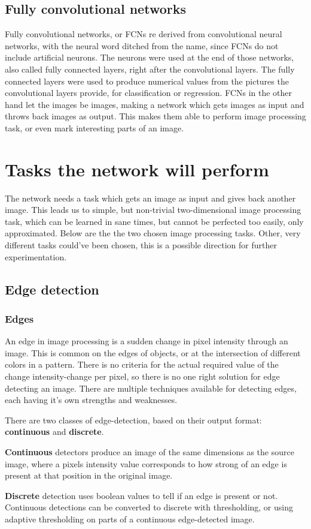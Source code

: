 \documentclass[12pt]{report}
\begin{document}
\section{Fully convolutional networks}
Fully convolutional networks, or FCNs re derived from convolutional neural networks, with the neural word ditched from the name, since FCNs do not include artificial neurons. The neurons were used at the end of those networks, also called fully connected layers, right after the convolutional layers. The fully connected layers were used to produce numerical values from the pictures the convolutional layers provide, for classification or regression. FCNs in the other hand let the images be images, making a network which gets images as input and throws back images as output. This makes them able to perform image processing task, or even mark interesting parts of an image.
\chapter{Tasks the network will perform}
The network needs a task which gets an image as input and gives back another image. This leads us to simple, but non-trivial two-dimensional image processing task, which can be learned in sane times, but cannot be perfected too easily, only approximated. Below are the the two chosen image processing tasks. Other, very different tasks could've been chosen, this is a possible direction for further experimentation.
\section{Edge detection}
\subsection{Edges}
An edge in image processing is a sudden change in pixel intensity through an image. This is common on the edges of objects, or at the intersection of different colors in a pattern. There is no criteria for the actual required value of the change intensity-change per pixel, so there is no one right solution for edge detecting an image. There are multiple techniques available for detecting edges, each having it's own strengths and weaknesses.\par
There are two classes of edge-detection, based on their output format: \textbf{continuous} and \textbf{discrete}.\par
\textbf{Continuous} detectors produce an image of the same dimensions as the source image, where a pixels intensity value corresponds to how strong of an edge is present at that position in the original image.\par
\textbf{Discrete} detection uses boolean values to tell if an edge is present or not. Continuous detections can be converted to discrete with thresholding, or using adaptive thresholding on parts of a continuous edge-detected image.
\end{document}
